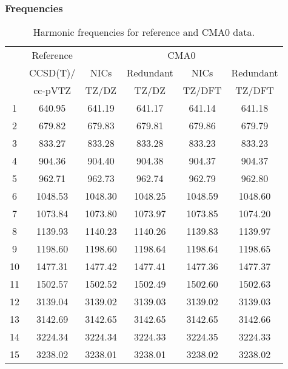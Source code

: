 \documentclass[10pt,oneside]{article}
\begin{document}
\begin{table}[h!]
\subsubsection*{Frequencies}
\centering
\caption{Harmonic frequencies for reference and CMA0 data.}
\begin{tabular}{cccccc}
\toprule
{} & Reference & \multicolumn{4}{c}{CMA0} \\
{} &  CCSD(T)/ &    NICs &  Redundant &    NICs & Redundant \\
{} &   cc-pVTZ &   TZ/DZ &      TZ/DZ &  TZ/DFT &    TZ/DFT \\
\midrule
1  &    640.95 &  641.19 &     641.17 &  641.14 &    641.18 \\
2  &    679.82 &  679.83 &     679.81 &  679.86 &    679.79 \\
3  &    833.27 &  833.28 &     833.28 &  833.23 &    833.23 \\
4  &    904.36 &  904.40 &     904.38 &  904.37 &    904.37 \\
5  &    962.71 &  962.73 &     962.74 &  962.79 &    962.80 \\
6  &   1048.53 & 1048.30 &    1048.25 & 1048.59 &   1048.60 \\
7  &   1073.84 & 1073.80 &    1073.97 & 1073.85 &   1074.20 \\
8  &   1139.93 & 1140.23 &    1140.26 & 1139.83 &   1139.97 \\
9  &   1198.60 & 1198.60 &    1198.64 & 1198.64 &   1198.65 \\
10 &   1477.31 & 1477.42 &    1477.41 & 1477.36 &   1477.37 \\
11 &   1502.57 & 1502.52 &    1502.49 & 1502.60 &   1502.63 \\
12 &   3139.04 & 3139.02 &    3139.03 & 3139.02 &   3139.03 \\
13 &   3142.69 & 3142.65 &    3142.65 & 3142.65 &   3142.66 \\
14 &   3224.34 & 3224.34 &    3224.33 & 3224.35 &   3224.33 \\
15 &   3238.02 & 3238.01 &    3238.01 & 3238.02 &   3238.02 \\
\bottomrule
\end{tabular}
\end{table}
\end{document}
